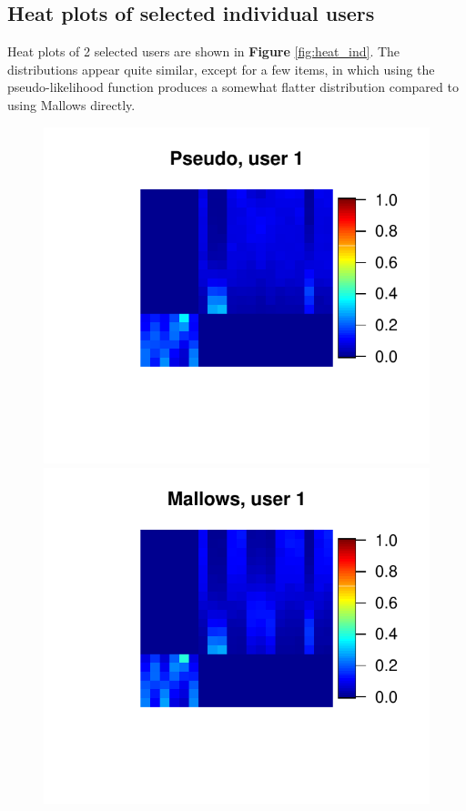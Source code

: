 \documentclass[11pt, oneside]{article}   	%
\begin{document}
\subsection{Heat plots of selected individual users}
Heat plots of 2 selected users are shown in \textbf{Figure} \ref{fig:heat_ind}. The distributions appear quite similar, except for a few items, in which using the pseudo-likelihood function produces a somewhat flatter distribution compared to using Mallows directly. 
\begin{figure}[hbt!]
	\begin{minipage}[t]{.45\textwidth}
		\centering
		\includegraphics[width=\textwidth]{figures/clicking/pseudo_user1}
		
	\end{minipage}
	\hfill
	\begin{minipage}[t]{.45\textwidth}
		\centering
		\includegraphics[width=\textwidth]{figures/clicking/mallows_user1}
		

\end{minipage}
\end{figure}
\end{document}
